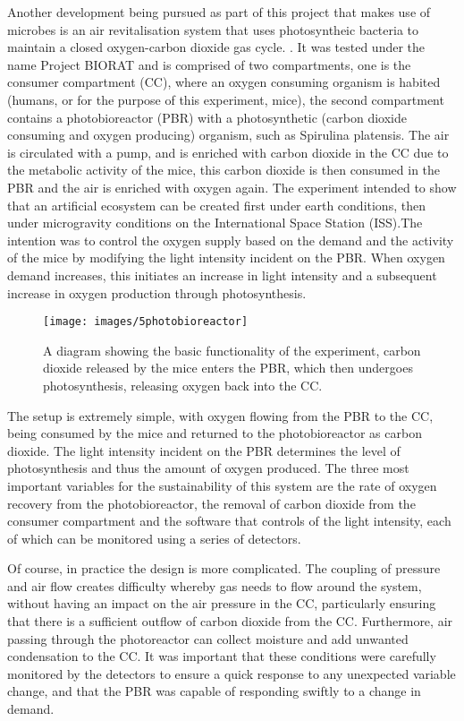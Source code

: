 \documentclass[12pt]{article}
\begin{document}
Another development being pursued as part of this project that makes use of microbes is an air revitalisation system that uses photosyntheic bacteria to maintain a closed oxygen-carbon dioxide gas cycle. \cite{agency2000exemple}. It was tested under the name Project BIORAT and is comprised of two compartments, one is the consumer compartment (CC), where an oxygen consuming organism is habited (humans, or for the purpose of this experiment, mice), the second compartment contains a photobioreactor (PBR) with a photosynthetic (carbon dioxide consuming and oxygen producing) organism, such as Spirulina platensis. The air is circulated with a pump, and is enriched with carbon dioxide in the CC due to the metabolic activity of the mice, this carbon dioxide is then consumed in the PBR and the air is enriched with oxygen again. The experiment intended to show that an artificial ecosystem can be created first under earth conditions, then under microgravity conditions on the International Space Station (ISS).The intention was to control the oxygen supply based on the demand and the activity of the mice by modifying the light intensity incident on the PBR. When oxygen demand increases, this initiates an increase in light intensity and a subsequent increase in oxygen production through photosynthesis.

\begin{figure}[ht]
\centering
\texttt{[image: images/5photobioreactor]}
\caption{A diagram showing the basic functionality of the experiment, carbon dioxide released by the mice enters the PBR, which then undergoes photosynthesis, releasing oxygen back into the CC. \cite{agency2000exemple}}
\label{fig:5photobioreactor}
\end{figure}

The setup is extremely simple, with oxygen flowing from the PBR to the CC, being consumed by the mice and returned to the photobioreactor as carbon dioxide. The light intensity incident on the PBR determines the level of photosynthesis and thus the amount of oxygen produced. 
The three most important variables for the sustainability of this system are the rate of oxygen recovery from the photobioreactor, the removal of carbon dioxide from the consumer compartment and the software that controls of the light intensity, each of which can be monitored using a series of detectors. 

Of course, in practice the design is more complicated. The coupling of pressure and air flow creates difficulty whereby gas needs to flow around the system, without having an impact on the air pressure in the CC, particularly ensuring that there is a sufficient outflow of carbon dioxide from the CC. Furthermore, air passing through the photoreactor can collect moisture and add unwanted condensation to the CC. It was important that these conditions were carefully monitored by the detectors to ensure a quick response to any unexpected variable change, and that the PBR was capable of responding swiftly to a change in demand.
\end{document}

